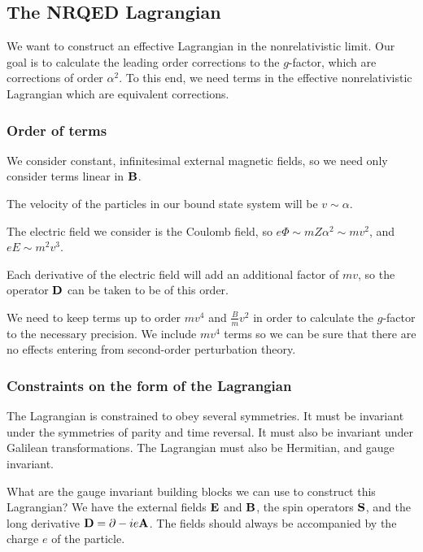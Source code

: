\subsection{The NRQED Lagrangian}

We want to construct an effective Lagrangian in the nonrelativistic limit.  Our goal is to calculate the leading order corrections to the $g$-factor, which are corrections of order $\alpha^2$.  To this end, we need terms in the effective nonrelativistic Lagrangian which are equivalent corrections.

\subsubsection{Order of terms}
We consider constant, infinitesimal external magnetic fields, so we need only consider terms linear in $\mathbf{B}$.

The velocity of the particles in our bound state system will be $v \sim \alpha$.

The electric field we consider is the Coulomb field, so $e\Phi \sim m Z\alpha^2 \sim mv^2$, and $eE \sim m^2v^3$.

Each derivative of the electric field will add an additional factor of $mv$, so the operator $\mathbf{D}$ can be taken to be of this order.

We need to keep terms up to order $mv^4$ and $\frac{B}{m} v^2$ in order to calculate the $g$-factor to the necessary precision.  We include $mv^4$ terms so we can be sure that there are no effects entering from second-order perturbation theory.



\subsubsection{Constraints on the form of the Lagrangian}
The Lagrangian is constrained to obey several symmetries.  It must be invariant under the symmetries of parity and time reversal.  It must also be invariant under Galilean transformations.  The Lagrangian must also be Hermitian, and gauge invariant.

What are the gauge invariant building blocks we can use to construct this Lagrangian?  We have the external fields $\mathbf{E}$ and $\mathbf{B}$, the spin operators $\mathbf{S}$, and the long derivative $\mathbf{D} = \mathbf{\partial} - i e\mathbf{A}$.  The fields should always be accompanied by the charge $e$ of the particle.

